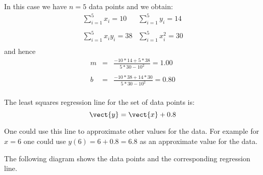 \begin{solution}
In this case we have $n=5$ data points and we obtain:
\begin{equation*}
\begin{array}{ll}
\sum_{i=1}^{5}x_{i} = 10 & \sum_{i=1}^{5}y_{i} =  14 \\
\\
\sum_{i=1}^{5}x_{i}y_{i}  =  38 & \sum_{i=1}^{5}x_{i}^{2}  =   30\\
\end{array}
\end{equation*}
and hence
\begin{eqnarray*}
m &=& \frac{- 10 * 14 + 5*38}{5*30-10^2} = 1.00 \\
\\
b &=& \frac{- 10 * 38 + 14*30}{5*30-10^2} = 0.80 \\
\end{eqnarray*}

The  least squares regression line for the set of data points is:
\[ \vect{y} = \vect{x}+0.8 \] 

One could use this line to approximate other values for the data. For
example for $x=6$ one could use $y(6)=6+0.8=6.8$ as an approximate
value for the data.

The following diagram shows the data points and the corresponding regression line.

\begin{center}
\end{center}
\end{solution}

